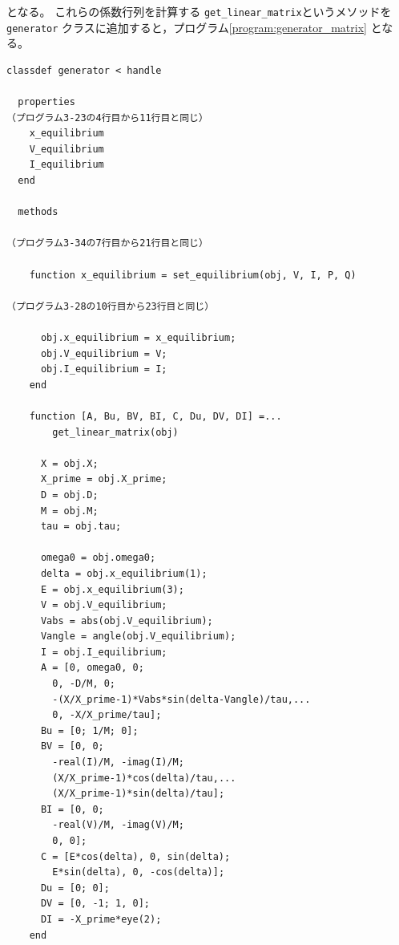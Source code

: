 \documentclass[tombow,dvipdfmx]{corona-a5-1.1}
\begin{document}
\begin{例}[近似線形モデルの実装]
となる。
これらの係数行列を計算する
\verb|get_linear_matrix|というメソッドを\verb|generator|
クラスに追加すると，プログラム\ref{program:generator_matrix}
となる。

\smallskip
\begin{PROGRAMA}[count,title={generator.m}]\label{program:generator_matrix}
\begin{verbatim}
classdef generator < handle
  
  properties
（プログラム3-23の4行目から11行目と同じ）
    x_equilibrium
    V_equilibrium
    I_equilibrium
  end
  
  methods

（プログラム3-34の7行目から21行目と同じ）

    function x_equilibrium = set_equilibrium(obj, V, I, P, Q)

（プログラム3-28の10行目から23行目と同じ）

      obj.x_equilibrium = x_equilibrium;
      obj.V_equilibrium = V;
      obj.I_equilibrium = I;
    end
    
    function [A, Bu, BV, BI, C, Du, DV, DI] =...
        get_linear_matrix(obj)
      
      X = obj.X;
      X_prime = obj.X_prime;
      D = obj.D;
      M = obj.M;
      tau = obj.tau;
      
      omega0 = obj.omega0;
      delta = obj.x_equilibrium(1);
      E = obj.x_equilibrium(3);
      V = obj.V_equilibrium;
      Vabs = abs(obj.V_equilibrium);
      Vangle = angle(obj.V_equilibrium);
      I = obj.I_equilibrium;
      A = [0, omega0, 0;
        0, -D/M, 0;
        -(X/X_prime-1)*Vabs*sin(delta-Vangle)/tau,...
        0, -X/X_prime/tau];
      Bu = [0; 1/M; 0];
      BV = [0, 0;
        -real(I)/M, -imag(I)/M;
        (X/X_prime-1)*cos(delta)/tau,...
        (X/X_prime-1)*sin(delta)/tau];
      BI = [0, 0;
        -real(V)/M, -imag(V)/M;
        0, 0];
      C = [E*cos(delta), 0, sin(delta);
        E*sin(delta), 0, -cos(delta)];
      Du = [0; 0];
      DV = [0, -1; 1, 0];
      DI = -X_prime*eye(2);
    end


\end{verbatim}
\end{PROGRAMA}
\end{例}
\end{document}
